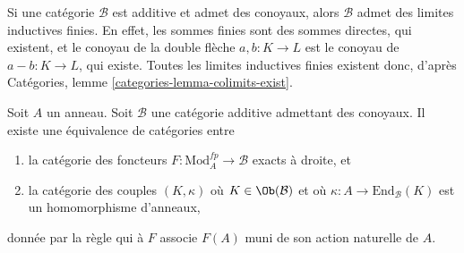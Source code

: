 \noindent
Si une catégorie $\mathcal{B}$ est additive et admet des conoyaux,
alors $\mathcal{B}$ admet des limites inductives finies. En effet, les sommes finies
sont des sommes directes, qui existent, et le conoyau de la double flèche $a, b : K \to L$
est le conoyau de $a - b : K \to L$, qui existe. Toutes les limites inductives
finies existent donc, d'après Catégories, lemme \ref{categories-lemma-colimits-exist}.

\begin{lemma}
\label{lemma-functor-on-modules-fp}
Soit $A$ un anneau. Soit $\mathcal{B}$ une catégorie additive
admettant des conoyaux. Il existe une équivalence de catégories entre
\begin{enumerate}
\item la catégorie des foncteurs $F : \text{Mod}^{fp}_A \to \mathcal{B}$
exacts à droite, et
\item la catégorie des couples $(K, \kappa)$ où $K \in \Ob(\mathcal{B})$
et où $\kappa : A \to \text{End}_\mathcal{B}(K)$ est un homomorphisme d'anneaux,
\end{enumerate}
donnée par la règle qui à $F$ associe $F(A)$ muni de son action naturelle de $A$.
\end{lemma}

